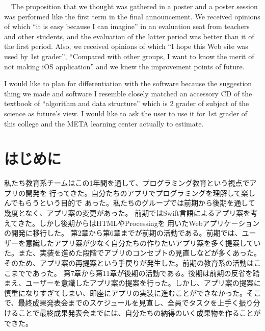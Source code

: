 \documentclass[openany,11pt,papersize]{jsbook}
\begin{document}
\begin{eabstract}
　The proposition that we thought was gathered in a poster and a poster session was performed like the first term in the final announcement. We received opinions of which ``it is easy because I can imagine'' in an evaluation seat from teachers and other students, and the evaluation of the latter period was better than it of the first period. Also, we received opinions of which ``I hope this Web site was used by 1st grader'', ``Compared with other groups, I want to know the merit of not making iOS application'' and we knew the improvement points of future.

I would like to plan for differentiation with the software because the suggestion thing we made and software I resemble closely matched an accessory CD of the textbook of ``algorithm and data structure'' which is 2 grader of subject of the science as future's view. I would like to ask the user to use it for 1st grader of this college and the META learning center actually to estimate.
\end{eabstract}

\tableofcontents%


\mainmatter%

\chapter{はじめに}
私たち教育系チームはこの1年間を通して、プログラミング教育という視点でアプリの開発を
行ってきた。自分たちのアプリでプログラミングを理解して楽しんでもらうという目的で
あった。私たちのグループでは前期から後期を通して幾度となく、アプリ案の変更があった。
前期ではSwift言語によるアプリ案を考えてきた。しかし後期からはHTMLやProcessingを
用いたWebアプリケーションの開発に移行した。
第2章から第6章までが前期の活動である。前期では、ユーザーを意識したアプリ案が少なく自分たちの作りたいアプリ案を多く提案していた。また、実装を進めた段階でアプリのコンセプトの見直しなどが多くあった。そのため、アプリ案の再提案という手戻りが発生した。前期の教育系の活動はここまでであった。
第7章から第11章が後期の活動である。後期は前期の反省を踏まえ、ユーザーを意識したアプリ案の提案を行った。しかし、アプリ案の提案に慎重になりすぎてしまい、即座にアプリの実装に進むことができなかった。そこで、最終成果発表会までのスケジュールを見直し、全員でタスクを上手く振り分けることで最終成果発表会までには、自分たちの納得のいく成果物を作ることができた。
\end{document}
